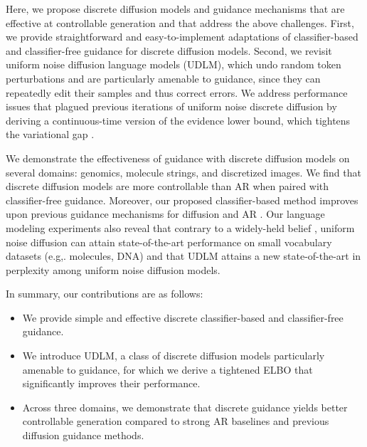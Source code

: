 \documentclass{article} %
\begin{document}
Here, we propose discrete diffusion models and guidance mechanisms that are effective at controllable generation and that address the above challenges. 
First, we provide straightforward and easy-to-implement adaptations of classifier-based and classifier-free guidance for discrete diffusion models.
Second, we revisit uniform noise diffusion language models (UDLM), which undo random token perturbations and are particularly amenable to guidance, since they can repeatedly edit their samples \citep{austin2021structured} and thus correct errors.
We address performance issues that plagued previous iterations of uniform noise discrete diffusion by deriving a continuous-time version of the evidence lower bound, which tightens the variational gap \citep{kingma2021variational,sahoo2024simple}.

We demonstrate the effectiveness of guidance with discrete diffusion models on several domains: genomics, molecule strings, and discretized images.
We find that discrete diffusion models are more controllable than AR when paired with classifier-free guidance.
Moreover, our proposed classifier-based method improves upon previous guidance mechanisms for diffusion \citep{gruver2024protein} and AR \citep{dathathri2019plug, yang2021fudge}.
Our language modeling experiments also reveal that contrary to a widely-held belief \citep{austin2021structured,lou2023discrete}, uniform noise diffusion can attain state-of-the-art performance on small vocabulary datasets (e.g,. molecules, DNA) and that UDLM attains a new state-of-the-art in perplexity among uniform noise diffusion models.

In summary, our contributions are as follows:
\begin{itemize}
    \item We provide simple and effective discrete classifier-based and classifier-free guidance.
    \item We introduce UDLM, a class of discrete diffusion models particularly amenable to guidance, for which we derive a tightened ELBO that significantly improves their performance.
    \item Across three domains, we demonstrate that discrete guidance yields better controllable generation compared to strong AR baselines and previous diffusion guidance methods.
\end{itemize}
\end{document}
